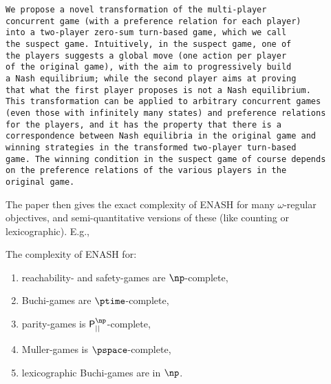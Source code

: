 \begin{verbatim}
We propose a novel transformation of the multi-player
concurrent game (with a preference relation for each player) 
into a two-player zero-sum turn-based game, which we call 
the suspect game. Intuitively, in the suspect game, one of 
the players suggests a global move (one action per player 
of the original game), with the aim to progressively build 
a Nash equilibrium; while the second player aims at proving 
that what the first player proposes is not a Nash equilibrium.
This transformation can be applied to arbitrary concurrent games 
(even those with infinitely many states) and preference relations
for the players, and it has the property that there is a 
correspondence between Nash equilibria in the original game and 
winning strategies in the transformed two-player turn-based 
game. The winning condition in the suspect game of course depends 
on the preference relations of the various players in the 
original game. 
\end{verbatim}

The paper then gives the exact complexity of ENASH for many $\omega$-regular 
objectives, and semi-quantitative versions of these (like counting or 
lexicographic). E.g., 
\begin{theorem}
The complexity of ENASH for:
\begin{enumerate}
 \item reachability- and safety-games are $\np$-complete, 
 \item Buchi-games are $\ptime$-complete,
 \item parity-games is ${\sf P}^\np_{||}$-complete,
 \item Muller-games is $\pspace$-complete,
 \item lexicographic Buchi-games are in $\np$.
\end{enumerate}
\end{theorem}



